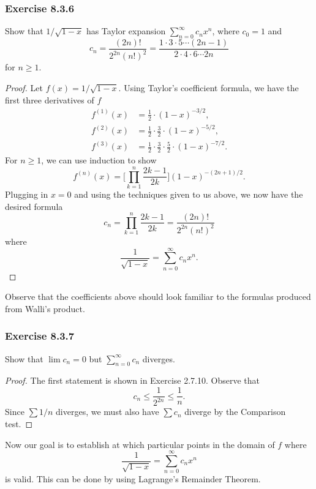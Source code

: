 \subsubsection{Exercise 8.3.6} Show that \( 1 / \sqrt{ 1 - x  }  \) has Taylor expansion \( \sum_{ n=0 }^{ \infty  } c_{n} x^{n}  \), where \( c_{0} = 1  \) and 
\[  c_{n} = \frac{ (2n)!  }{  2^{2n} (n!)^{2}  } = \frac{ 1 \cdot 3 \cdot 5 \dotsb (2n-1) }{ 2 \cdot 4 \cdot 6 \dotsb 2n }  \] for \( n \geq 1  \).
\begin{proof}
Let \( f(x) = 1 / \sqrt{ 1 - x  }  \). Using Taylor's coefficient formula, we have the first three derivatives of \( f  \)
\begin{align*}
    f^{(1)}(x) &= \frac{ 1 }{ 2 } \cdot (1 - x )^{-3/2}, \\
    f^{(2)}(x) &= \frac{ 1  }{ 2 }  \cdot \frac{ 3 }{ 2 } \cdot  (1-x)^{-5/2}, \\
    f^{(3)}(x) &= \frac{ 1 }{ 2 }  \cdot \frac{ 3 }{ 2 }  \cdot \frac{ 5 }{ 2 } \cdot (1- x)^{-7/2}.
\end{align*}
For \( n  \geq 1 \), we can use induction to show  
\[  f^{(n)}(x) =  \Big[ \prod_{k=1}^{n} \frac{ 2k-1 }{ 2k }   \Big] (1 -x )^{-(2n+1)/2}. \] Plugging in \( x = 0  \) and using the techniques given to us above, we now have the desired formula
\[  c_{n} = \prod_{k=1}^{n} \frac{ 2k-1 }{ 2k } = \frac{ (2n)!  }{ 2^{2n}  (n!)^2   }  \] 
where 
\[  \frac{ 1 }{ \sqrt{ 1-x  }  }  = \sum_{ n=0 }^{ \infty  } c_{n} x^{n}. \]

\end{proof}

Observe that the coefficients above should look familiar to the formulas produced from Walli's product.

\subsubsection{Exercise 8.3.7} Show that \( \lim c_{n} =  0  \) but \( \sum_{ n=0  }^{ \infty  } c_{n}  \) diverges.
\begin{proof}
The first statement is shown in Exercise 2.7.10. Observe that 
\[  c_{n} \leq  \frac{ 1 }{ 2^{2n} } \leq \frac{ 1 }{ n }. \] Since \( \sum 1 / n  \) diverges, we must also have \( \sum c_{n}   \) diverge by the Comparison test. 
\end{proof}

Now our goal is to establish at which particular points in the domain of \( f  \) where 
\[  \frac{ 1 }{ \sqrt{ 1- x  }  }  = \sum_{ n=0 }^{ \infty  } c_{n} x^{n} \tag{4}  \] is valid. This can be done by using Lagrange's Remainder Theorem. 

